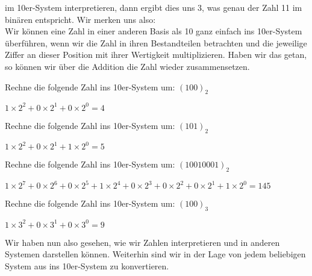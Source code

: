 \begin{exerciseseries}[columns=1,solsubrule=\hrule]{}
\begin{solution}
        im 10er-System interpretieren, dann ergibt dies uns 3, was genau der Zahl 11 im binären entspricht. Wir merken
        uns also:\\
        Wir können eine Zahl in einer anderen Basis als 10 ganz einfach ins 10er-System überführen, wenn wir die Zahl
        in ihren Bestandteilen betrachten und die jeweilige Ziffer an dieser Position mit ihrer Wertigkeit multiplizieren.
        Haben wir das getan, so können wir über die Addition die Zahl wieder zusammensetzen.
    \end{solution}
    \begin{exercise}
        Rechne die folgende Zahl ins 10er-System um: $(100)_2$\\
        \underline{\hspace{12cm}}
    \end{exercise}
    \begin{solution}
        $1 \times 2^2 + 0 \times 2^1 + 0 \times 2^0 = 4$
    \end{solution}

    \begin{exercise}
        Rechne die folgende Zahl ins 10er-System um: $(101)_2$\\
        \underline{\hspace{12cm}}
    \end{exercise}
    \begin{solution}
        $1 \times 2^2 + 0 \times 2^1 + 1 \times 2^0 = 5$
    \end{solution}

    \begin{exercise}
        Rechne die folgende Zahl ins 10er-System um: $(10010001)_2$\\
        \underline{\hspace{12cm}}
    \end{exercise}
    \begin{solution}
        $1 \times 2^7 + 0 \times 2^6 + 0 \times 2^5 + 1 \times 2^4 + 0 \times 2^3 + 0 \times 2^2 + 0 \times 2^1 + 1 \times 2^0 = 145$
    \end{solution}

    \begin{exercise}
        Rechne die folgende Zahl ins 10er-System um: $(100)_3$\\
        \underline{\hspace{12cm}}
    \end{exercise}
    \begin{solution}
        $1 \times 3^2 + 0 \times 3^1 + 0 \times 3^0 = 9$
    \end{solution}
\end{exerciseseries}
Wir haben nun also gesehen, wie wir Zahlen interpretieren und in anderen Systemen darstellen können. Weiterhin sind wir
in der Lage von jedem beliebigen System aus ins 10er-System zu konvertieren.

\newpage
\subsection{\solutionsname}
\loadSolutions